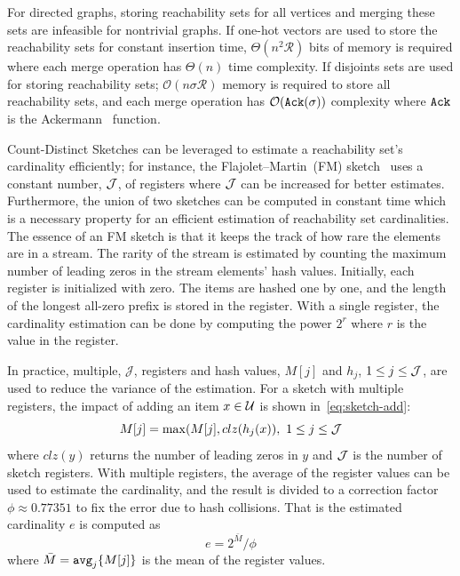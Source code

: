 \documentclass[review]{elsarticle}
\newcommand\kktodo[1]{\textcolor{red}{#1}}
\begin{document}
For directed graphs, storing reachability sets for all vertices and merging these sets are infeasible for nontrivial graphs. 
If one-hot vectors are used to store the reachability sets for constant insertion time, $\Theta(n^2\mathcal{R})$ bits of memory is required where each merge operation has $\Theta(n)$ time complexity. 
If disjoints sets are used for storing reachability sets; $\mathcal{O}(n{\sigma}\mathcal{R})$ 
memory is required to store all reachability sets, and each merge operation has $\mathcal{O}({\tt Ack}(\sigma))$ complexity where ${\tt Ack}$ is the Ackermann~\cite{ackermann} function. %

Count-Distinct Sketches can be leveraged to estimate a reachability set's cardinality efficiently; for instance, the Flajolet–Martin~(FM) sketch~\cite{flajolet1985probabilistic} uses a constant number, ${\cal J}$, of registers where ${\cal J}$ can be increased for better estimates. Furthermore, the union of two sketches can be computed in constant time which is a necessary property for an efficient estimation of reachability set cardinalities. The essence of an FM sketch is that it keeps the track of how rare the elements are in a stream. The rarity of the stream is estimated by counting the maximum number of leading zeros in the stream elements' hash values. Initially, each register is initialized with zero. The items are hashed one by one, and the length of the longest all-zero prefix is stored in the register. With a single register, the cardinality estimation can be done by computing the power $2^r$ where $r$ is the value in the register.

In practice, multiple, ${\mathcal J}$, registers and hash values, $M[j]$ and $h_j$, $1 \leq j \leq {\cal J}$, are used to reduce the variance of the estimation. For a sketch with multiple registers, the impact of adding an item $x \in \cal{U}$ is shown in~\eqref{eq:sketch-add}:
\begin{equation}
    \label{eq:sketch-add}
    M[j] = \max(M[j], clz(h_j(x)),~1 \leq j \leq {\cal J}
\end{equation} where $clz(y)$ returns the number of leading zeros in $y$ and ${\cal J}$ is the number of sketch registers. With multiple registers, the average of the register values can be used to estimate the cardinality, and the result is divided to a correction factor $\phi \approx 0.77351$ to fix the error due to hash collisions. That is the estimated cardinality $e$ is computed as
\begin{equation}
    \label{eq:sketch-estimate}
    e = 2^{\bar{M}}/\phi
\end{equation} 
where $\bar{M} = {\tt{avg}}_j\{M[j]\}$ is the mean of the register values.
\end{document}
